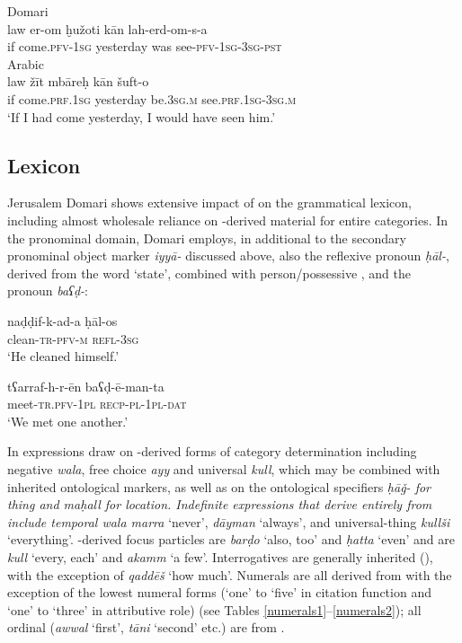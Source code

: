 \documentclass[output=paper]{langsci/langscibook}
\begin{document}
\ea
\ea
{Domari}\\
\gll law er-om ḫužoti kān lah-erd-om-s-a \\
       if come.\textsc{pfv-1sg} yesterday was see-\textsc{pfv-1sg-3sg-pst}\\
\ex
{Arabic}\\
\gll law žīt mbāreḥ kān šuft-o  \\
       if come.\textsc{prf.1sg} yesterday be.\textsc{3sg.m} see.\textsc{prf.1sg-3sg.m}\\
\glt   ‘If I had come yesterday, I would have seen him.’
\z
\z

\subsection{Lexicon
}

Jerusalem Domari shows extensive impact of  on the grammatical lexicon, including almost wholesale reliance on -derived material for entire categories. In the pronominal domain, Domari employs, in additional to the secondary pronominal object marker \textit{iyyā-} discussed above, also the  reflexive pronoun \textit{ḥāl-}, derived from the word ‘state’, combined with person/possessive , and the   pronoun \textit{baʕḍ-}:

\ea \gll naḍḍif-k-ad-a ḥāl-os\\
     clean-\textsc{tr-pfv-m} \textsc{refl-3sg}\\
\glt ‘He cleaned himself.’
\z

\ea \gll tʕarraf-h-r-ēn baʕḍ-ē-man-ta\\
     meet-\textsc{tr.pfv-1pl} \textsc{recp-pl-1pl-dat}\\
\glt ‘We met one another.’
\z

In expressions draw on -derived forms of category determination including negative \textit{wala}, free choice \textit{ayy} and universal \textit{kull}, which may be combined with inherited ontological markers, as well as on the ontological specifiers \textit{ḥāǧ- \textup{for thing and} maḥall \textup{for location. Indefinite expressions that derive entirely from  include temporal} wala marra} {{‘never’,} \textit{dāyman} \textup{‘always’, and universal-thing} \textit{kullši} \textup{‘everything’. -derived} }focus particles are \textit{barḍo} ‘also, too’ and \textit{ḥatta} ‘even’ and  are \textit{kull} ‘every, each’ and \textit{akamm} ‘a few’. Interrogatives are generally inherited (), with the exception of \textit{qaddēš} ‘how much’. Numerals are all derived from  with the exception of the lowest numeral forms (`one' to `five' in citation function and `one' to `three' in attributive role) (see Tables \ref{numerals1}–\ref{numerals2}); all ordinal  (\textit{awwal} ‘first’, \textit{tāni} `second' etc.) are from .
\\
\end{document}
